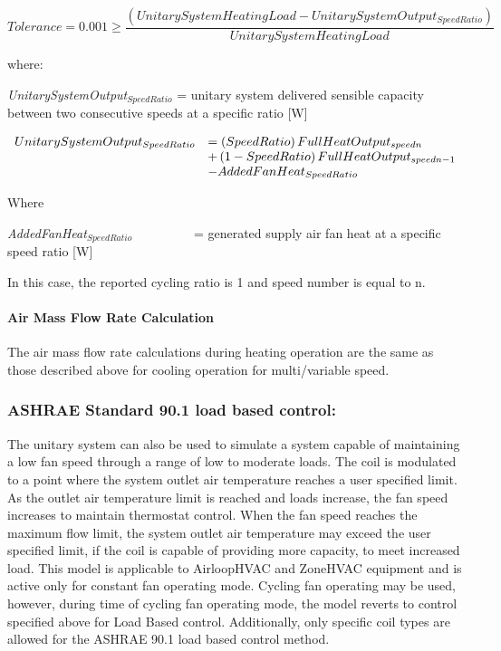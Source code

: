 \begin{equation}
Tolerance = 0.001 \ge \frac{{\left( {UnitarySystemHeatingLoad - UnitarySystemOutpu{t_{SpeedRatio}}} \right)}}{{UnitarySystemHeatingLoad}}
\end{equation}

where:

\emph{UnitarySystemOutput\(_{SpeedRatio}\)} = unitary system delivered sensible capacity between two consecutive speeds at a specific ratio {[}W{]}

\begin{equation}
  \begin{array}{rl}
    UnitarySystemOutput_{SpeedRatio} &= \PB{SpeedRatio} FullHeatOutput_{speedn} \\
                                     &+ \PB{1 - SpeedRatio} FullHeatOutput_{speedn - 1} \\ 
                                     &- AddedFanHeat_{SpeedRatio}
  \end{array}
\end{equation}

Where

\emph{AddedFanHeat\(_{SpeedRatio}\)}~~~~~~~~~ = generated supply air fan heat at a specific speed ratio {[}W{]}

In this case, the reported cycling ratio is 1 and speed number is equal to n.

\paragraph{Air Mass Flow Rate Calculation}\label{air-mass-flow-rate-calculation-1}

The air mass flow rate calculations during heating operation are the same as those described above for cooling operation for multi/variable speed.

\subsubsection{ASHRAE Standard 90.1 load based control:}\label{ashrae-901-load-based-control}

The unitary system can also be used to simulate a system capable of maintaining a low fan speed through a range of low to moderate loads. The coil is modulated to a point where the system outlet air temperature reaches a user specified limit. As the outlet air temperature limit is reached and loads increase, the fan speed increases to maintain thermostat control. When the fan speed reaches the maximum flow limit, the system outlet air temperature may exceed the user specified limit, if the coil is capable of providing more capacity, to meet increased load. This model is applicable to AirloopHVAC and ZoneHVAC equipment and is active only for constant fan operating mode. Cycling fan operating may be used, however, during time of cycling fan operating mode, the model reverts to control specified above for Load Based control. Additionally, only specific coil types are allowed for the ASHRAE 90.1 load based control method. 

